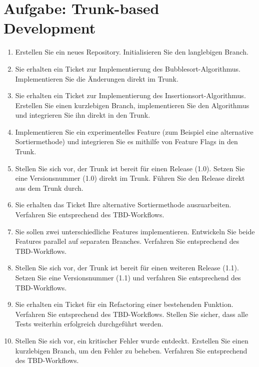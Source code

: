 
\section{Aufgabe: Trunk-based Development}
\label{sec:task:tbd}

\begin{enumerate}
    \item Erstellen Sie ein neues Repository. Initialisieren Sie den langlebigen Branch.
    \item Sie erhalten ein Ticket zur Implementierung des Bubblesort\hyp Algorithmus. Implementieren Sie die Änderungen direkt im Trunk.
    \item Sie erhalten ein Ticket zur Implementierung des Insertionsort\hyp Algorithmus. Erstellen Sie einen kurzlebigen Branch, implementieren Sie den Algorithmus und integrieren Sie ihn direkt in den Trunk.
    \item Implementieren Sie ein experimentelles Feature (zum Beispiel eine alternative Sortiermethode) und integrieren Sie es mithilfe von Feature Flags in den Trunk.
    \item Stellen Sie sich vor, der Trunk ist bereit für einen Release (1.0).
    Setzen Sie eine Versionsnummer (1.0) direkt im Trunk.
    Führen Sie den Release direkt aus dem Trunk durch.
    \item Sie erhalten das Ticket Ihre alternative Sortiermethode auszuarbeiten. Verfahren Sie entsprechend des TBD-Workflows.
    \item Sie sollen zwei unterschiedliche Features implementieren. Entwickeln Sie beide Features parallel auf separaten Branches. Verfahren Sie entsprechend des TBD-Workflows.
    \item Stellen Sie sich vor, der Trunk ist bereit für einen weiteren Release (1.1).
    Setzen Sie eine Versionsnummer (1.1) und verfahren Sie entsprechend des TBD-Workflows.
    \item Sie erhalten ein Ticket für ein Refactoring einer bestehenden Funktion. Verfahren Sie entsprechend des TBD-Workflows. Stellen Sie sicher, dass alle Tests weiterhin erfolgreich durchgeführt werden.
    \item Stellen Sie sich vor, ein kritischer Fehler wurde entdeckt.
    Erstellen Sie einen kurzlebigen Branch, um den Fehler zu beheben. Verfahren Sie entsprechend des TBD-Workflows.
\end{enumerate}
